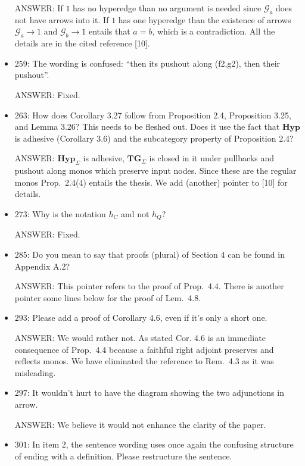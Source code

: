 \documentclass[english,11pt,a4paper]{article}
\begin{document}
\begin{itemize}
ANSWER: If $1$ has no hyperedge than no argument is needed since $\mathcal{G}_a$ does not have arrows into it. If $1$ has one hyperedge than the existence of arrows $\mathcal{G}_a\to 1$ and $\mathcal{G}_b\to 1$ entails that $a=b$, which is a contradiction. All the details are in the cited reference [10].

\item $259$: The wording is confused: ``then its pushout along (f2,g2), then their pushout''.

ANSWER: Fixed.

\item $263$: How does Corollary 3.27 follow from Proposition 2.4, Proposition 3.25, and Lemma 3.26? This needs to be fleshed out. Does it use the fact that $\mathbf{Hyp}$ is adhesive (Corollary 3.6) and the subcategory property of Proposition 2.4?

ANSWER: $\mathbf{Hyp}_\Sigma$ is adhesive, $\mathbf{TG}_\Sigma$ is closed in it under pullbacks and pushout along monos which preserve input nodes. Since these are the regular monos Prop.~2.4(4) entails the thesis. We add (another) pointer to [10] for details.


\item $273$: Why is the notation $h_C$ and not $h_Q$?

ANSWER: Fixed.

\item $285$: Do you mean to say that proofs (plural) of Section 4 can be found in Appendix A.2?

ANSWER: This pointer refers to the proof of Prop.~4.4. There is another pointer some lines below for the proof of Lem.~4.8.

\item $293$: Please add a proof of Corollary 4.6, even if it's only a short one.

ANSWER: We would rather not. As stated Cor. 4.6 is an immediate consequence of Prop.~4.4 because a faithful right adjoint preserves and reflects monos. We have eliminated the reference to Rem.~4.3 as it was misleading.


\item $297$: It wouldn't hurt to have the diagram showing the two adjunctions in arrow.

ANSWER: We believe it would not enhance the clarity of the paper.

\item $301$: In item 2, the sentence wording uses once again the confusing structure of ending with a definition. Please restructure the sentence.


\end{itemize}
\end{document}
